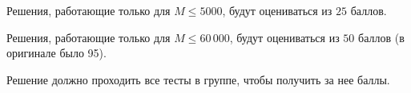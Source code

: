 Решения, работающие только для $M \le 5000$, будут оцениваться из $25$ баллов.

Решения, работающие только для $M \le 60\,000$, будут оцениваться
из $50$ баллов (в оригинале было 95).

Решение должно проходить все тесты в группе, чтобы получить за нее баллы.
